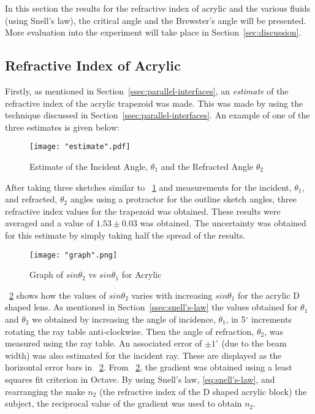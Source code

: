 \documentclass{article}
\newcommand{\figref}[2][\figurename~]{#1\ref{#2}}
\newcommand{\secref}[2][Section~]{#1\ref{#2}}
\begin{document}
In this section the results for the refractive index of acrylic and the various fluids (using Snell's law), the critical angle and the Brewster's angle will be presented. More evaluation into the experiment will take place in \secref{sec:discussion}.

\subsection{Refractive Index of Acrylic}
\label{ssec:refractive-index-of-acrylic}

\vspace{2mm}
\noindent
Firstly, as mentioned in \secref{ssec:parallel-interfaces}, an \textit{estimate} of the refractive index of the acrylic trapezoid was made. This was made by using the technique discussed in \secref{ssec:parallel-interfaces}. An example of one of the three estimates is given below:

\begin{figure}[h]
\centering
\texttt{[image: "estimate".pdf]}
\caption{Estimate of the Incident Angle, $\theta_1$ and the Refracted Angle $\theta_2$}
\label{fig:estimate}
\end{figure}

\vspace{2mm}
\noindent
After taking three sketches similar to \figref{fig:estimate} and measurements for the incident, $\theta_1$, and refracted, $\theta_2$ angles using a protractor for the outline sketch angles, three refractive index values for the trapezoid was obtained. These results were averaged and a value of $1.53 \pm 0.03$ was obtained. The uncertainty was obtained for this estimate by simply taking half the spread of the results. 

\vspace{2mm}
\noindent

\begin{figure}[h]
\centering
\texttt{[image: "graph".png]}
\caption{Graph of $sin{\theta_2}$ vs $sin{\theta_1}$ for Acrylic}
\label{fig:graph}
\end{figure}

\vspace{2mm}
\noindent
\figref{fig:graph} shows how the values of $sin{\theta_2}$ varies with increasing $sin{\theta_1}$ for the acrylic D shaped lens. As mentioned in \secref{ssec:snell's-law} the values obtained for $\theta_1$ and $\theta_2$ we obtained by increasing the angle of incidence, $\theta_1$, in 5$^{\circ}$ increments rotating the ray table anti-clockwise. Then the angle of refraction, $\theta_2$, was measured using the ray table. An associated error of $\pm1^{\circ}$ (due to the beam width) was also estimated for the incident ray. These are displayed as the horizontal error bars in \figref{fig:graph}. From \figref{fig:graph}, the gradient was obtained using a least squares fit criterion in Octave. By using Snell's law, \eqref{eq:snell's-law}, and rearranging the make $n_2$ (the refractive index of the D shaped acrylic block) the subject, the reciprocal value of the gradient was used to obtain $n_2$.
\end{document}
